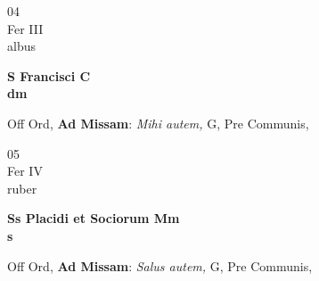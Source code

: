 \documentclass[10pt, openany]{book}
\begin{document}
        \begin{center}
            \begin{minipage}{3.5in}
                \vspace{2em}
                \begin{minipage}{0.5in}
                    {\Huge 04} \\
                    {\normalsize Fer III} \\
                    {\normalsize albus}
                \end{minipage}
                \begin{minipage}{3.0in}
                    \textbf{ \large S Francisci C \\
                    \textnormal{\normalsize dm}} \\ 
                \end{minipage}
                \begin{justify}Off Ord, \textbf{Ad Missam}: \textit{Mihi autem,} G, Pre Communis,   
                \end{justify}
            \end{minipage}
        \end{center}
    
        \begin{center}
            \begin{minipage}{3.5in}
                \vspace{2em}
                \begin{minipage}{0.5in}
                    {\Huge 05} \\
                    {\normalsize Fer IV} \\
                    {\normalsize ruber}
                \end{minipage}
                \begin{minipage}{3.0in}
                    \textbf{ \large Ss Placidi et Sociorum Mm \\
                    \textnormal{\normalsize s}} \\ 
                \end{minipage}
                \begin{justify}Off Ord, \textbf{Ad Missam}: \textit{Salus autem,} G, Pre Communis,   
                \end{justify}
            \end{minipage}
        \end{center}
    
\end{document}
